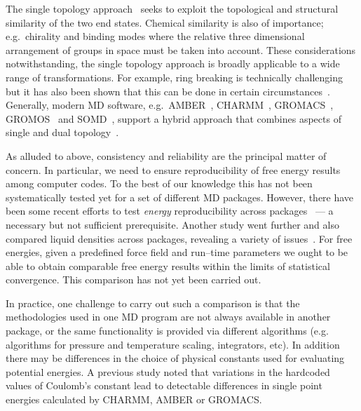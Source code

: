 \documentclass[journal=jctcce,manuscript=article]{achemso}
\begin{document}
%
The single topology approach~\cite{doi:10.1021/j100056a020} seeks to exploit the
topological and structural similarity of the two end states.
Chemical similarity is also of
importance; e.g.\ chirality and binding modes where the relative three
dimensional arrangement of groups in space must be taken into account.
These considerations notwithstanding, the single topology approach is broadly applicable to a wide range of transformations.
For example, ring breaking is technically
challenging~\cite{doi:10.1021/acs.jctc.6b00991} but it has also been
shown that this can be done in certain
circumstances~\cite{doi:10.1021/acs.jcim.5b00057,
  doi:10.1021/jp994193s}.
Generally, modern MD software, e.g.\ AMBER~\cite{case_amber_2005},
CHARMM~\cite{JCC:JCC21287}, GROMACS~\cite{Abraham201519},
GROMOS~\cite{doi:10.1021/jp984217f} and SOMD~\cite{Sire-2016,
  doi:10.1021/ct300857j}, support a hybrid approach that combines aspects of single and dual topology~\cite{doi:10.1021/jp994193s}.


As alluded to above, consistency and reliability are the principal matter of concern.
In particular, we need to ensure reproducibility of free energy results
among computer codes.  To the best of our knowledge this has not been
systematically tested yet for a set of different MD packages.
However, there have been some recent efforts to test \emph{energy}
reproducibility across packages~\cite{Shirts2017} --- a necessary but not
sufficient prerequisite.  Another study went further and also compared liquid
densities across packages, revealing a variety of
issues~\cite{doi:10.1021/acs.jctc.7b00489}.
For free energies, given a predefined force field and run--time
parameters we ought to be able to obtain comparable free energy
results within the limits of statistical convergence.  This comparison
has not yet been carried out.

In practice, one challenge to carry out such a comparison is that the methodologies
used in one MD program are not always available in another
package, or the same functionality is provided via different algorithms (e.g. algorithms for pressure and temperature
scaling, integrators, etc).  In addition there may be differences in
the choice of physical constants used for evaluating potential
energies.  A previous study noted that variations in the hardcoded
values of Coulomb's constant lead to detectable differences in single
point energies calculated by CHARMM, AMBER or
GROMACS.~\cite{Shirts2017, SOMDcoulomb}
\end{document}
